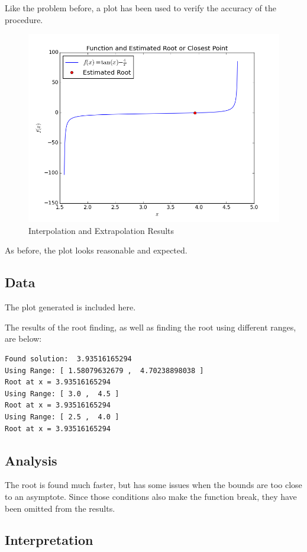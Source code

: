 \documentclass[10pt,letter]{article}
\begin{document}
Like the problem before, a plot has been used to verify the accuracy of the procedure.

\begin{figure}[h]
  \centering
    \includegraphics[width=.7\textwidth]{homework2_problem2_plot1}
  \caption{Interpolation and Extrapolation Results}
\end{figure}

As before, the plot looks reasonable and expected.

\subsection{Data}

The plot generated is included here.

The results of the root finding, as well as finding the root using different ranges, are below:

\begin{verbatim}
Found solution:  3.93516165294
Using Range: [ 1.58079632679 ,  4.70238898038 ]
Root at x = 3.93516165294
Using Range: [ 3.0 ,  4.5 ]
Root at x = 3.93516165294
Using Range: [ 2.5 ,  4.0 ]
Root at x = 3.93516165294
\end{verbatim}

\subsection{Analysis}

The root is found much faster, but has some issues when the bounds are too close to an asymptote. Since those conditions also make the function break, they have been omitted from the results.

\subsection{Interpretation}
\end{document}
